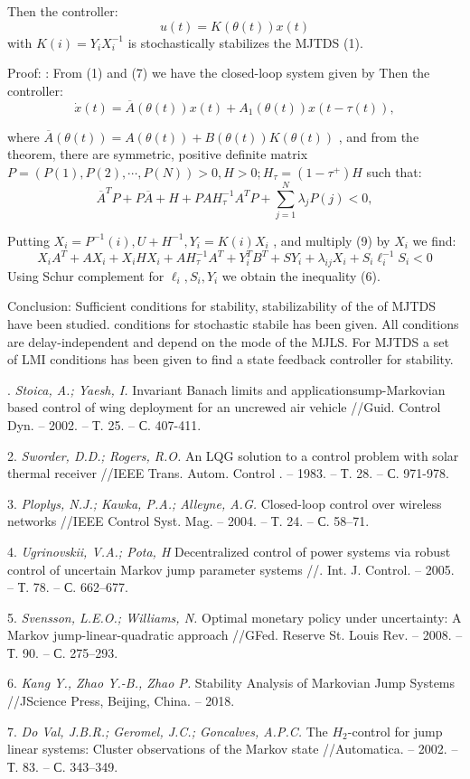 \documentclass{vzmsthesis}
\begin{document}
Then the controller:
\begin{equation}
u(t)=K(\theta(t))x(t)
\end{equation}
with $K(i)=Y_i X_i^{-1}$ is stochastically stabilizes the MJTDS (1).

Proof: : From (1) and (7) we have the closed-loop system given by
Then the controller:
\begin{equation}
\dot{x}(t)=\overline A(\theta(t))x(t) +A_1(\theta(t))x(t-\tau(t)),
\end{equation}

where $\overline A(\theta(t))=A(\theta(t))+B(\theta(t))K(\theta(t))$ ,  and from the theorem, there are symmetric, positive definite matrix $P=(P(1),P(2),\cdots,P(N))>0 ,H>0; H_\tau =(1-\tau^+)H$ such that:
\begin{equation}
\overline A^TP +P\overline A+H+ PAH_\tau^{-1}A^TP+\sum_{j=1}^{N}\lambda_j P(j)<0,
\end{equation}

Putting  $X_i=P^{-1}(i), U+H^{-1}, Y_i=K(i)X_i$  , and multiply (9) by $X_i$  we find:
\begin{equation}
X_iA^T+AX_i+X_iHX_i+AH_\tau ^{-1} A^T+Y_i^TB^T+SY_i+\lambda_{ij}X_i+S_i\ell_i^{-1}S_i<0
\end{equation}
Using Schur complement for $\ell_i , S_i , Y_i$ we obtain the inequality (6).

Conclusion:
 Sufficient conditions for stability, stabilizability of the of MJTDS have been studied.  conditions for stochastic stabile has been given. All conditions are delay-independent and depend on the mode of the MJLS.  For  MJTDS a set of LMI conditions has been given to find a state feedback controller for stability.

. {\it Stoica, A.; Yaesh, I. }
 Invariant Banach limits and applicationsump-Markovian based control of wing deployment for an uncrewed air vehicle //Guid. Control Dyn. – 2002. – Т. 25.  – С. 407-411.
 
2. {\it Sworder, D.D.; Rogers, R.O.  }
 An LQG solution to a control problem with solar thermal receiver //IEEE Trans. Autom. Control . – 1983. – Т. 28. – С. 971-978.
 
3. {\it Ploplys, N.J.; Kawka, P.A.; Alleyne, A.G. }
 Closed-loop control over wireless networks //IEEE Control Syst. Mag. – 2004. – Т. 24.  – С. 58–71.
 
4. {\it Ugrinovskii, V.A.; Pota, H }
 Decentralized control of power systems via robust control of uncertain Markov jump parameter systems //. Int. J. Control. – 2005. – Т. 78. – С. 662–677.
 
5. {\it Svensson, L.E.O.; Williams, N. }
 Optimal monetary policy under uncertainty: A Markov jump-linear-quadratic approach //GFed. Reserve St. Louis Rev. – 2008. – Т. 90. – С. 275–293.
 
6. {\it Kang Y., Zhao Y.-B., Zhao P. }
 Stability Analysis of Markovian Jump Systems //JScience Press, Beijing, China. – 2018.
 
7. {\it Do Val, J.B.R.; Geromel, J.C.; Goncalves, A.P.C.}
 The $H_2$-control for jump linear systems: Cluster observations of the Markov state //Automatica. – 2002. – Т. 83. – С. 343–349.
\end{document}
